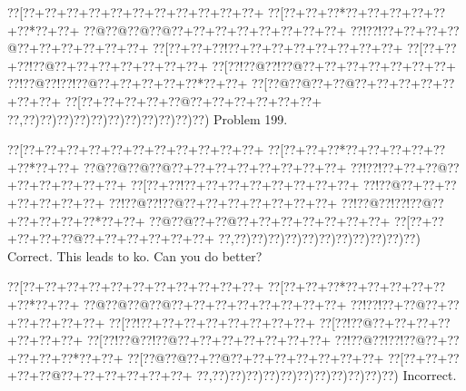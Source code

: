 \documentclass[a5paper]{article}
\begin{document}
\begin{center}
{\goo
\0??[\0??+\0??+\0??+\0??+\0??+\0??+\0??+\0??+\0??+\0??+\0??+
\0??[\0??+\0??+\0??*\0??+\0??+\0??+\0??+\0??+\0??*\0??+\0??+
\0??@\0??@\0??@\0??@\0??+\0??+\0??+\0??+\0??+\0??+\0??+\0??+
\0??!\0??!\0??+\0??+\0??+\0??@\0??+\0??+\0??+\0??+\0??+\0??+
\0??[\0??+\0??+\0??!\0??+\0??+\0??+\0??+\0??+\0??+\0??+\0??+
\0??[\0??+\0??+\0??!\0??@\0??+\0??+\0??+\0??+\0??+\0??+\0??+
\0??[\0??!\0??@\0??!\0??@\0??+\0??+\0??+\0??+\0??+\0??+\0??+
\0??!\0??@\0??!\0??!\0??@\0??+\0??+\0??+\0??+\0??*\0??+\0??+
\0??[\0??@\0??@\0??+\0??@\0??+\0??+\0??+\0??+\0??+\0??+\0??+
\0??[\0??+\0??+\0??+\0??+\0??@\0??+\0??+\0??+\0??+\0??+\0??+
\0??,\0??)\0??)\0??)\0??)\0??)\0??)\0??)\0??)\0??)\0??)\0??)
}
Problem 199.

\end{center}
\begin{center}
{\goo
\0??[\0??+\0??+\0??+\0??+\0??+\0??+\0??+\0??+\0??+\0??+\0??+
\0??[\0??+\0??+\0??*\0??+\0??+\0??+\0??+\0??+\0??*\0??+\0??+
\0??@\0??@\0??@\0??@\0??+\0??+\0??+\0??+\0??+\0??+\0??+\0??+
\0??!\0??!\0??+\0??+\0??@\0??+\0??+\0??+\0??+\0??+\0??+
\0??[\0??+\0??!\0??+\0??+\0??+\0??+\0??+\0??+\0??+\0??+
\0??!\0??@\0??+\0??+\0??+\0??+\0??+\0??+\0??+
\0??!\0??@\0??!\0??@\0??+\0??+\0??+\0??+\0??+\0??+\0??+
\0??!\0??@\0??!\0??!\0??@\0??+\0??+\0??+\0??+\0??*\0??+\0??+
\0??@\0??@\0??+\0??@\0??+\0??+\0??+\0??+\0??+\0??+\0??+
\0??[\0??+\0??+\0??+\0??+\0??@\0??+\0??+\0??+\0??+\0??+\0??+
\0??,\0??)\0??)\0??)\0??)\0??)\0??)\0??)\0??)\0??)\0??)\0??)
}
Correct. This leads to ko. Can you do better?

\end{center}
\begin{center}
{\goo
\0??[\0??+\0??+\0??+\0??+\0??+\0??+\0??+\0??+\0??+\0??+\0??+
\0??[\0??+\0??+\0??*\0??+\0??+\0??+\0??+\0??+\0??*\0??+\0??+
\0??@\0??@\0??@\0??@\0??+\0??+\0??+\0??+\0??+\0??+\0??+\0??+
\0??!\0??!\0??+\0??@\0??+\0??+\0??+\0??+\0??+\0??+
\0??[\0??!\0??+\0??+\0??+\0??+\0??+\0??+\0??+\0??+
\0??[\0??!\0??@\0??+\0??+\0??+\0??+\0??+\0??+\0??+
\0??[\0??!\0??@\0??!\0??@\0??+\0??+\0??+\0??+\0??+\0??+\0??+
\0??!\0??@\0??!\0??!\0??@\0??+\0??+\0??+\0??+\0??*\0??+\0??+
\0??[\0??@\0??@\0??+\0??@\0??+\0??+\0??+\0??+\0??+\0??+\0??+
\0??[\0??+\0??+\0??+\0??+\0??@\0??+\0??+\0??+\0??+\0??+\0??+
\0??,\0??)\0??)\0??)\0??)\0??)\0??)\0??)\0??)\0??)\0??)\0??)
}
Incorrect. 

\end{center}
\end{document}
